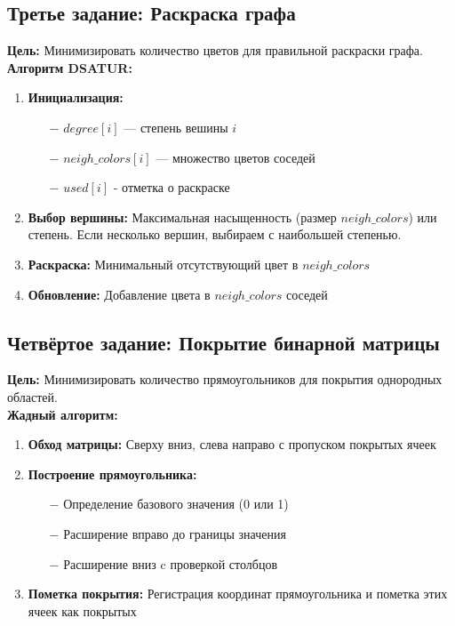 \documentclass[oneside,a4paper,14pt]{extarticle}
\begin{document}
\clearpage

\subsection{Третье задание: Раскраска графа}

\textbf{Цель:} Минимизировать количество цветов для правильной раскраски графа.\\

\noindent\textbf{Алгоритм DSATUR:}
\begin{enumerate}
    \item \textbf{Инициализация:}
    \begin{itemize}
        \item[$-$] $degree[i]$ — степень вешины $i$
        \item[$-$] $neigh\_colors[i]$ — множество цветов соседей
        \item[$-$] $used[i]$ - отметка о раскраске
    \end{itemize}
    \item \textbf{Выбор вершины:} Максимальная насыщенность (размер $neigh\_colors$) или степень. Если несколько вершин, выбираем с наибольшей степенью.
    \item \textbf{Раскраска:} Минимальный отсутствующий цвет в $neigh\_colors$
    \item \textbf{Обновление:} Добавление цвета в $neigh\_colors$ соседей
\end{enumerate}

\clearpage

\subsection{Четвёртое задание: Покрытие бинарной матрицы}

\textbf{Цель:} Минимизировать количество прямоугольников для покрытия однородных областей.\\

\noindent\textbf{Жадный алгоритм:}
\begin{enumerate}
    \item \textbf{Обход матрицы:} Сверху вниз, слева направо с пропуском покрытых ячеек
    \item \textbf{Построение прямоугольника:}
    \begin{itemize}
        \item[$-$] Определение базового значения (0 или 1)
        \item[$-$] Расширение вправо до границы значения
        \item[$-$] Расширение вниз c проверкой столбцов
    \end{itemize}
    \item \textbf{Пометка покрытия:} Регистрация координат прямоугольника и пометка этих ячеек как покрытых
\end{enumerate}
\end{document}
